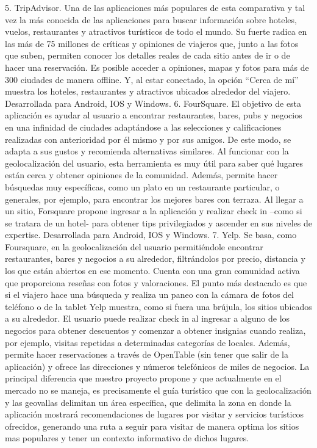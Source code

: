 5. TripAdvisor. Una de las aplicaciones más populares de esta comparativa y tal vez la más conocida de las aplicaciones para buscar información sobre hoteles, vuelos, restaurantes y atractivos turísticos de todo el mundo. Su fuerte radica en las más de 75 millones de críticas y opiniones de viajeros que, junto a las fotos que suben, permiten conocer los detalles reales de cada sitio antes de ir o de hacer una reservación. Es posible acceder a opiniones, mapas y fotos para más de 300 ciudades de manera offline. Y, al estar conectado, la opción “Cerca de mí” muestra los hoteles, restaurantes y atractivos ubicados alrededor del viajero. Desarrollada para Android, IOS y Windows.
6. FourSquare. El objetivo de esta aplicación es ayudar al usuario a encontrar restaurantes, bares, pubs y negocios en una infinidad de ciudades adaptándose a las selecciones y calificaciones realizadas con anterioridad por él mismo y por sus amigos. De este modo, se adapta a sus gustos y recomienda alternativas similares. Al funcionar con la geolocalización del usuario, esta herramienta es muy útil para saber qué lugares están cerca y obtener opiniones de la comunidad. Además, permite hacer búsquedas muy específicas, como un plato en un restaurante particular, o generales, por ejemplo, para encontrar los mejores bares con terraza. Al llegar a un sitio, Forsquare propone ingresar a la aplicación y realizar check in –como si se tratara de un hotel- para obtener tips privilegiados y ascender en sus niveles de expertise. Desarrollada para Android, IOS y Windows.
7. Yelp. Se basa, como Foursquare, en la geolocalización del usuario permitiéndole encontrar restaurantes, bares y negocios a su alrededor, filtrándolos por precio, distancia y los que están abiertos en ese momento. Cuenta con una gran comunidad activa que proporciona reseñas con fotos y valoraciones. El punto más destacado es que si el viajero hace una búsqueda y realiza un paneo con la cámara de fotos del teléfono o de la tablet Yelp muestra, como si fuera una brújula, los sitios ubicados a su alrededor. El usuario puede realizar check in al ingresar a alguno de los negocios para obtener descuentos y comenzar a obtener insignias cuando realiza,  por ejemplo, visitas repetidas a determinadas categorías de locales. Además, permite hacer reservaciones a través de OpenTable (sin tener que salir de la aplicación) y ofrece las direcciones y números telefónicos de miles de negocios.
La principal diferencia que nuestro proyecto propone y que actualmente en el mercado no se maneja, es precisamente el guía turístico que con la geolocalización y las geovallas delimitan un área específica, que delimita la zona en donde la aplicación mostrará recomendaciones de lugares por visitar y servicios turísticos ofrecidos, generando una ruta a seguir para visitar de manera optima los sitios mas populares y tener un contexto informativo de dichos lugares.
